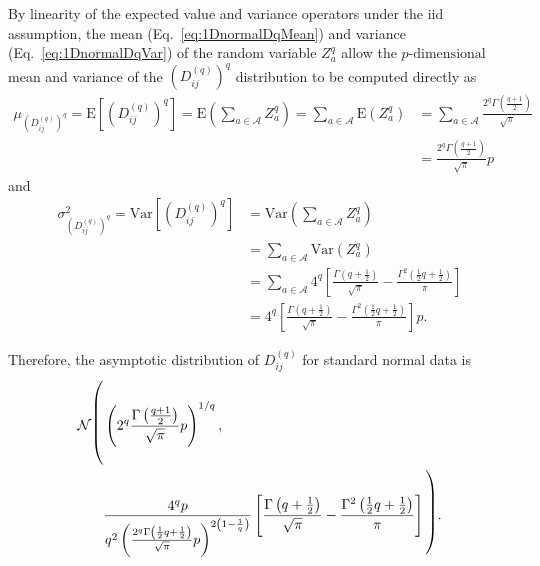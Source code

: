 \documentclass[aos]{imsart}
\begin{document}
By linearity of the expected value and variance operators under the iid assumption, the mean (Eq.~\ref{eq:1DnormalDqMean}) and variance (Eq.~\ref{eq:1DnormalDqVar}) of the random variable $Z^q_a$ allow the $p\text{-dimensional}$ mean and variance of the $\left(D^{(q)}_{ij}\right)^q$ distribution to be computed directly as
%
\begin{equation}\label{eq:normalDqMean}
\begin{aligned}
\mu_{\left(D^{(q)}_{ij}\right)^q} = \text{E}\left[\left(D^{(q)}_{ij}\right)^q\right] = \text{E}\left(\sum_{a \in \mathcal{A}} Z^q_a\right) = \sum_{a \in \mathcal{A}} \text{E}\left(Z^q_a\right) &= \sum_{a \in \mathcal{A}} \frac{2^q \Gamma\left(\frac{q + 1}{2}\right)}{\sqrt{\pi}} \\
&=  \frac{2^q\Gamma\left(\frac{q + 1}{2}\right)}{\sqrt{\pi}}p
\end{aligned}
\end{equation}
%
and
%
\begin{equation}\label{eq:normalVar}
\begin{split}
\sigma^2_{\left(D^{(q)}_{ij}\right)^q} = \text{Var}\left[\left(D^{(q)}_{ij}\right)^q\right] &= \text{Var}\left(\sum_{a \in \mathcal{A}} Z^q_a\right) \\
&= \sum_{a \in \mathcal{A}} \text{Var}\left(Z^q_a\right) \\
&= \sum_{a \in \mathcal{A}} 4^{q}\left[\frac{\Gamma\left(q + \frac{1}{2}\right)}{\sqrt{\pi}} - \frac{\Gamma^2\left(\frac{1}{2}q + \frac{1}{2}\right)}{\pi}\right] \\
&= 4^{q}\left[\frac{\Gamma\left(q + \frac{1}{2}\right)}{\sqrt{\pi}} - \frac{\Gamma^2\left(\frac{1}{2}q + \frac{1}{2}\right)}{\pi}\right]p.
\end{split}
\end{equation}

Therefore, the asymptotic distribution of $D^{(q)}_{ij}$ for standard normal data is
%
\begin{equation}\label{eq:normalDistr}
\begin{aligned}
\mathcal{N}{\fontsize{0.7cm}{1pt}\selectfont \Biggl(}&\left(2^q\frac{\Gamma\left(\frac{q + 1}{2}\right)}{\sqrt{\pi}}p\right)^{1/q}, \\
&\frac{4^q p}{q^2 \left(\frac{2^q \Gamma\left(\frac{1}{2}q + \frac{1}{2}\right)}{\sqrt{\pi}}p\right)^{2\left(1 - \frac{1}{q}\right)}}\left[\frac{\Gamma\left(q + \frac{1}{2}\right)}{\sqrt{\pi}} - \frac{\Gamma^2\left(\frac{1}{2}q + \frac{1}{2}\right)}{\pi}\right]{\fontsize{0.7cm}{1pt}\selectfont \Biggr)}.
\end{aligned}
\end{equation}
\end{document}
